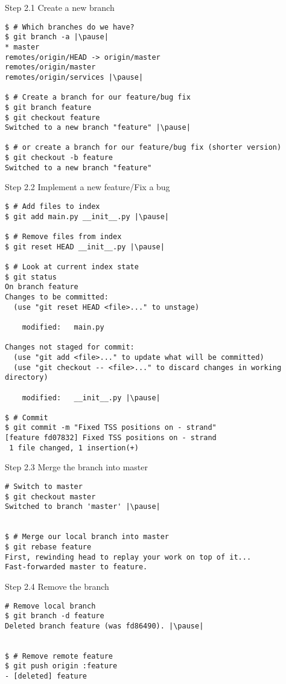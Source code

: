 \begin{frame}[fragile]{Step 2.1 Create a new branch}
	\begin{lstlisting}
$ # Which branches do we have?
$ git branch -a |\pause|
* master
remotes/origin/HEAD -> origin/master
remotes/origin/master
remotes/origin/services |\pause|

$ # Create a branch for our feature/bug fix 
$ git branch feature
$ git checkout feature 
Switched to a new branch "feature" |\pause|

$ # or create a branch for our feature/bug fix (shorter version)
$ git checkout -b feature 
Switched to a new branch "feature"
  	\end{lstlisting}
\end{frame}

\begin{frame}[fragile]{Step 2.2 Implement a new feature/Fix a bug}
  	\begin{lstlisting}
$ # Add files to index
$ git add main.py __init__.py |\pause|

$ # Remove files from index
$ git reset HEAD __init__.py |\pause|

$ # Look at current index state
$ git status
On branch feature
Changes to be committed:
  (use "git reset HEAD <file>..." to unstage)

	modified:   main.py

Changes not staged for commit:
  (use "git add <file>..." to update what will be committed)
  (use "git checkout -- <file>..." to discard changes in working directory)

	modified:   __init__.py |\pause|

$ # Commit
$ git commit -m "Fixed TSS positions on - strand"
[feature fd07832] Fixed TSS positions on - strand
 1 file changed, 1 insertion(+)
  	\end{lstlisting}
\end{frame}

%


\begin{frame}[fragile]{Step 2.3 Merge the branch into master}
  	\begin{lstlisting}
# Switch to master
$ git checkout master
Switched to branch 'master' |\pause|


$ # Merge our local branch into master
$ git rebase feature
First, rewinding head to replay your work on top of it...
Fast-forwarded master to feature.
	\end{lstlisting}
\end{frame}

\begin{frame}[fragile]{Step 2.4 Remove the branch}
  	\begin{lstlisting}
# Remove local branch
$ git branch -d feature
Deleted branch feature (was fd86490). |\pause|


$ # Remove remote feature
$ git push origin :feature
- [deleted] feature
	\end{lstlisting}
\end{frame}

